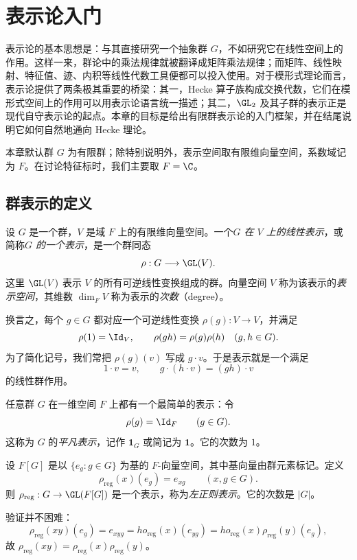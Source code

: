 \chapter{表示论入门}

表示论的基本思想是：与其直接研究一个抽象群 $G$，不如研究它在线性空间上的作用。这样一来，群论中的乘法规律就被翻译成矩阵乘法规律；而矩阵、线性映射、特征值、迹、内积等线性代数工具便都可以投入使用。对于模形式理论而言，表示论提供了两条极其重要的桥梁：其一，Hecke 算子族构成交换代数，它们在模形式空间上的作用可以用表示论语言统一描述；其二，$\GL_2$ 及其子群的表示正是现代自守表示论的起点。本章的目标是给出有限群表示论的入门框架，并在结尾说明它如何自然地通向 Hecke 理论。

本章默认群 $G$ 为有限群；除特别说明外，表示空间取有限维向量空间，系数域记为 $F$。在讨论特征标时，我们主要取 $F=\C$。

\section{群表示的定义}

\begin{definition}
设 $G$ 是一个群，$V$ 是域 $F$ 上的有限维向量空间。一个\emph{$G$ 在 $V$ 上的线性表示}，或简称\emph{$G$ 的一个表示}，是一个群同态
\[
\rho:G\longrightarrow \GL(V).
\]
这里 $\GL(V)$ 表示 $V$ 的所有可逆线性变换组成的群。向量空间 $V$ 称为该表示的\emph{表示空间}，其维数 $\dim_F V$ 称为表示的\emph{次数}（degree）。
\end{definition}

换言之，每个 $g\in G$ 都对应一个可逆线性变换 $\rho(g):V\to V$，并满足
\[
\rho(1)=\Id_V,\qquad \rho(gh)=\rho(g)\rho(h)\quad (g,h\in G).
\]
为了简化记号，我们常把 $\rho(g)(v)$ 写成 $g\cdot v$。于是表示就是一个满足
\[
1\cdot v=v,\qquad g\cdot(h\cdot v)=(gh)\cdot v
\]
的线性群作用。

\begin{example}[平凡表示]
任意群 $G$ 在一维空间 $F$ 上都有一个最简单的表示：令
\[
\rho(g)=\Id_F\qquad (g\in G).
\]
这称为 $G$ 的\emph{平凡表示}，记作 $\mathbf{1}_G$ 或简记为 $\mathbf{1}$。它的次数为 $1$。
\end{example}

\begin{example}[正则表示]
设 $F[G]$ 是以 $\{e_g:g\in G\}$ 为基的 $F$-向量空间，其中基向量由群元素标记。定义
\[
\rho_{\mathrm{reg}}(x)(e_g)=e_{xg}\qquad (x,g\in G).
\]
则 $\rho_{\mathrm{reg}}:G\to \GL(F[G])$ 是一个表示，称为\emph{左正则表示}。它的次数是 $|G|$。

验证并不困难：
\[
\rho_{\mathrm{reg}}(xy)(e_g)=e_{xyg}=
ho_{\mathrm{reg}}(x)(e_{yg})
=
ho_{\mathrm{reg}}(x)\rho_{\mathrm{reg}}(y)(e_g),
\]
故 $\rho_{\mathrm{reg}}(xy)=\rho_{\mathrm{reg}}(x)\rho_{\mathrm{reg}}(y)$。
\end{example}

